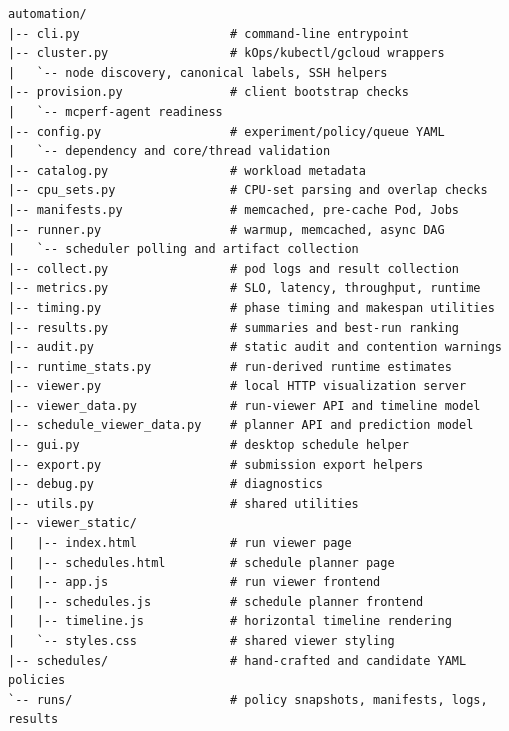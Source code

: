 \begin{Verbatim}[formatcom=\AutomationTreeFont,frame=single,framesep=2mm]
automation/
|-- cli.py                     # command-line entrypoint
|-- cluster.py                 # kOps/kubectl/gcloud wrappers
|   `-- node discovery, canonical labels, SSH helpers
|-- provision.py               # client bootstrap checks
|   `-- mcperf-agent readiness
|-- config.py                  # experiment/policy/queue YAML
|   `-- dependency and core/thread validation
|-- catalog.py                 # workload metadata
|-- cpu_sets.py                # CPU-set parsing and overlap checks
|-- manifests.py               # memcached, pre-cache Pod, Jobs
|-- runner.py                  # warmup, memcached, async DAG
|   `-- scheduler polling and artifact collection
|-- collect.py                 # pod logs and result collection
|-- metrics.py                 # SLO, latency, throughput, runtime
|-- timing.py                  # phase timing and makespan utilities
|-- results.py                 # summaries and best-run ranking
|-- audit.py                   # static audit and contention warnings
|-- runtime_stats.py           # run-derived runtime estimates
|-- viewer.py                  # local HTTP visualization server
|-- viewer_data.py             # run-viewer API and timeline model
|-- schedule_viewer_data.py    # planner API and prediction model
|-- gui.py                     # desktop schedule helper
|-- export.py                  # submission export helpers
|-- debug.py                   # diagnostics
|-- utils.py                   # shared utilities
|-- viewer_static/
|   |-- index.html             # run viewer page
|   |-- schedules.html         # schedule planner page
|   |-- app.js                 # run viewer frontend
|   |-- schedules.js           # schedule planner frontend
|   |-- timeline.js            # horizontal timeline rendering
|   `-- styles.css             # shared viewer styling
|-- schedules/                 # hand-crafted and candidate YAML policies
`-- runs/                      # policy snapshots, manifests, logs, results
\end{Verbatim}
